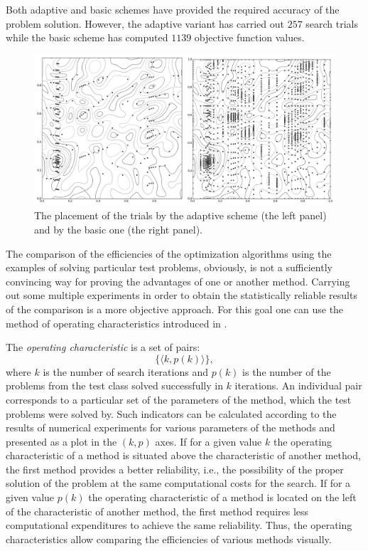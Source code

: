 \documentclass[smallextended]{svjour3}
\begin{document}
Both adaptive and basic schemes have provided the required accuracy of the problem solution. However, the adaptive variant has carried out $257$ search trials while the basic scheme has computed $1139$ objective function values.


\begin{figure}[H]
\includegraphics[width=116mm]{Fig2.png}
\caption{\label{fig:2}The placement of the trials by the adaptive scheme (the left panel) and by the basic one (the right panel).}
\end{figure}

The comparison of the efficiencies of the optimization algorithms using the examples of solving particular test problems, obviously, is not a sufficiently convincing way for proving the advantages of one or another method. Carrying out some multiple experiments in order to obtain the statistically reliable results of the comparison is a more objective approach. For this goal one can use the method of operating  characteristics introduced in \cite{Ref10, Ref36}.

The \textit{operating characteristic} is a set of pairs:
\begin{equation*}
\{ \langle k, p(k) \rangle \},
\end{equation*}
%
where $k$ is the number of search iterations and $p(k)$ is the number of the problems from the test class solved successfully in $k$ iterations. An individual pair corresponds to a particular set of the parameters of the method, which the test problems were solved by. Such indicators can be calculated according to the results of numerical experiments for various parameters of the methods and presented as a plot in the $(k, p)$ axes. If for a given value $k$ the operating characteristic of a method is situated  above the  characteristic of another method, the first method provides a better reliability, i.e., the possibility of the proper solution of the problem at the same computational costs for the search. If for a given value $p(k)$ the operating characteristic of a method is located on the left of the characteristic of another method, the first method requires less computational expenditures to achieve the same reliability. Thus, the operating characteristics allow comparing the efficiencies of various methods visually.
\end{document}
